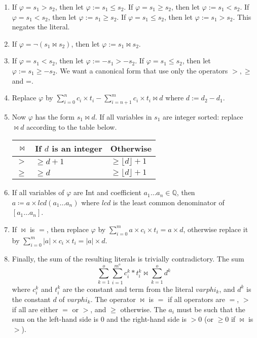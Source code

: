 \begin{enumerate}
    \item If $\varphi = s_1 > s_2$, then let $\varphi := s_1 \leq s_2$.
      If $\varphi = s_1 \geq s_2$, then let $\varphi := s_1 < s_2$.
      If $\varphi = s_1 < s_2$, then let $\varphi := s_1 \geq s_2$.
      If $\varphi = s_1 \leq s_2$, then let $\varphi := s_1 > s_2$. This negates
      the literal.
    
    \item If $\varphi = \neg (s_1 \bowtie s_2)$, then let $\varphi := s_1 \bowtie s_2$.
    
    \item If $\varphi = s_1 < s_2$, then let $\varphi :=   - s_1 > - s_2$.
      If $\varphi = s_1 \leq s_2$, then let $\varphi :=  s_1 \geq - s_2$.
      We want a canonical form that use only the operators $>, \geq$ and =.

    \item Replace $\varphi$ by $\sum_{i=0}^{n}c_i\times{}t_i - \sum_{i=n+1}^{m} c_i\times{}t_i
    \bowtie d$ where $d := d_2 - d_1$.
    
    \item \label{la_generic:str}Now $\varphi$ has the form $s_1 \bowtie d$. If all
    variables in $s_1$ are integer sorted: replace $\bowtie d$ according to
    the table below.

    \begin{center}
    \begin{tabular}{r|l|l}
        $\bowtie$  & If $d$ is an integer  & Otherwise \\
        \hline
        $>$        & $\geq d + 1$  & $\geq \lfloor d\rfloor + 1$  \\
        $\geq$     & $\geq d$      & $\geq \lfloor d\rfloor + 1$  \\
    \end{tabular}
    \end{center}

    \item If all variables of $\varphi$ are Int and coefficient $a_1 \dots a_n \in \mathbb{Q}$,
    then $a \coloneq a \times \mathit{lcd}(a_1 \dots a_n)$ where $\mathit{lcd}$ is the least common denominator of $[a_1 \dots a_n]$.
    
    \item If $\bowtie$ is $=$, then replace $\varphi$ by
    $\sum_{i=0}^{m}a\times{}c_i\times{}t_i = a\times{}d$, otherwise replace it by
    $\sum_{i=0}^{m}|a|\times{}c_i\times{}t_i = |a|\times{}d$.

    \item Finally, the sum of the resulting literals is trivially contradictory.
    The sum
    \[
        \sum_{k=1}^{o}\sum_{i=1}^{m^o}c_i^k*t_i^k \bowtie \sum_{k=1}^{o}d^k
    \]
  where $c_i^k$ and $t_i^k$ are the constant and term from the literal $varphi_k$, and $d^k$ is the constant $d$ of $varphi_k$.
  The operator $\bowtie$ is $=$ if all operators are $=$, $>$ if all are either $=$ or $>$, and $\geq$ otherwise. The $a_i$ must be such
  that the sum on the left-hand side is $0$ and the right-hand side is $>0$ (or $\geq 0$ if $\bowtie$ is $>$).

\end{enumerate}

